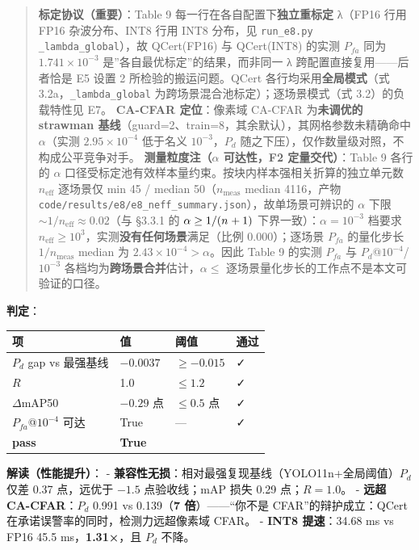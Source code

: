 \begin{quote}
\textbf{标定协议（重要）}：Table 9 每一行在各自配置下\textbf{独立重标定}
λ（FP16 行用 FP16 杂波分布、INT8 行用 INT8 分布，见 \texttt{run\_e8.py}
\texttt{\_lambda\_global}），故 QCert(FP16) 与 QCert(INT8) 的实测
\(P_{fa}\) 同为 \(1.741{\times}10^{-3}\)
是''各自最优标定''的结果，而非同一 λ 跨配置直接复用------后者恰是 E5
设置 2 所检验的搬运问题。QCert 各行均采用\textbf{全局模式}（式
3.2a，\texttt{\_lambda\_global} 为跨场景混合池标定）；逐场景模式（式
3.2）的负载特性见 E7。 \textbf{CA-CFAR 定位}：像素域 CA-CFAR
为\textbf{未调优的 strawman
基线}（guard=2、train=8，其余默认），其网格参数未精确命中
\(\alpha\)（实测 \(2.95{\times}10^{-4}\) 低于名义 \(10^{-3}\)，\(P_d\)
随之下压），仅作数量级对照，不构成公平竞争对手。
\textbf{测量粒度注（\(\alpha\) 可达性，F2 定量交代）}：Table 9 各行的
\(\alpha\) 口径受标定池有效样本量约束。按块内样本强相关折算的独立单元数
\(n_{\mathrm{eff}}\) 逐场景仅 min 45 / median 50（\(n_{\mathrm{meas}}\)
median 4116，产物
\texttt{code/results/e8/e8\_neff\_summary.json}），故单场景可辨识的
\(\alpha\) 下限 \(\sim 1/n_{\mathrm{eff}}\approx0.02\)（与 §3.3.1 的
\(\alpha\ge1/(n_{\cal}+1)\) 下界一致）：\(\alpha=10^{-3}\) 档要求
\(n_{\mathrm{eff}}\ge10^{3}\)，实测\textbf{没有任何场景}满足（比例
0.000）；逐场景 \(P_{fa}\) 的量化步长 \(1/n_{\mathrm{meas}}\) median 为
\(2.43{\times}10^{-4}>\alpha\)。因此 Table 9 的实测 \(P_{fa}\) 与
\(P_d\)@\(10^{-4}\)/\(10^{-3}\)
各档均为\textbf{跨场景合并}估计，\(\alpha\le\)
逐场景量化步长的工作点不是本文可验证的口径。
\end{quote}

\textbf{判定}：

{\def\LTcaptype{none} %
\begin{longtable}[]{@{}llll@{}}
\toprule\noalign{}
项 & 值 & 阈值 & 通过 \\
\midrule\noalign{}
\endhead
\bottomrule\noalign{}
\endlastfoot
\(P_d\) gap vs 最强基线 & \(-0.0037\) & \(\ge-0.015\) & ✓ \\
\(R\) & 1.0 & \(\le1.2\) & ✓ \\
\(\Delta\)mAP50 & \(-0.29\) 点 & \(\le0.5\) 点 & ✓ \\
\(P_{fa}\)@\(10^{-4}\) 可达 & True & --- & ✓ \\
\textbf{pass} & \textbf{True} & & \\
\end{longtable}
}

\textbf{解读（性能提升）}： -
\textbf{兼容性无损}：相对最强复现基线（YOLO11n+全局阈值）\(P_d\) 仅差
0.37 点，远优于 \(-1.5\) 点验收线；mAP 损失 0.29 点；\(R=1.0\)。 -
\textbf{远超 CA-CFAR}：\(P_d\) 0.991 vs 0.139（\textbf{7
倍}）------``你不是 CFAR''的辩护成立：QCert
在承诺误警率的同时，检测力远超像素域 CFAR。 - \textbf{INT8 提速}：34.68
ms vs FP16 45.5 ms，\textbf{1.31×}，且 \(P_d\) 不降。


